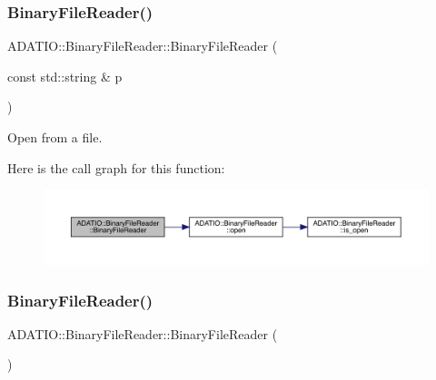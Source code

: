 \subsubsection{\texorpdfstring{BinaryFileReader()}{BinaryFileReader()}\hspace{0.1cm}{\footnotesize\ttfamily [2/4]}}
{\footnotesize\ttfamily A\+D\+A\+T\+I\+O\+::\+Binary\+File\+Reader\+::\+Binary\+File\+Reader (\begin{DoxyParamCaption}\item[{const std\+::string \&}]{p }\end{DoxyParamCaption})\hspace{0.3cm}{\ttfamily [explicit]}}



Open from a file. 

Here is the call graph for this function\+:\nopagebreak
\begin{figure}[H]
\begin{center}
\leavevmode
\includegraphics[width=350pt]{df/d41/classADATIO_1_1BinaryFileReader_a987273f138d0fcc4a1e9a95c51b093ef_cgraph}
\end{center}
\end{figure}
\mbox{\label{classADATIO_1_1BinaryFileReader_a77475e594db53a85f7f15050a442faa1}} 
\subsubsection{\texorpdfstring{BinaryFileReader()}{BinaryFileReader()}\hspace{0.1cm}{\footnotesize\ttfamily [3/4]}}
{\footnotesize\ttfamily A\+D\+A\+T\+I\+O\+::\+Binary\+File\+Reader\+::\+Binary\+File\+Reader (\begin{DoxyParamCaption}{ }\end{DoxyParamCaption})}

\mbox{\label{classADATIO_1_1BinaryFileReader_aa0905fcdd1723ce850a89baf9a111345}} 
